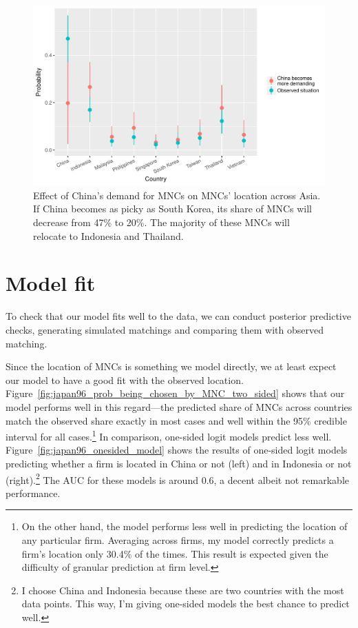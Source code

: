 \begin{figure}[!ht]
  \centering
  \includegraphics[width=\textwidth,keepaspectratio]{../figure/japan96_sim_china_more_demanding}
  \caption[Effect of China's demand for MNCs on MNCs' location across
  Asia.]{Effect of China's demand for MNCs on MNCs' location across Asia. If
    China becomes as picky as South Korea, its share of MNCs will decrease from
    47\% to 20\%. The majority of these MNCs will relocate to Indonesia and
    Thailand.}
  \label{fig:japan96_sim_china_more_demanding}
\end{figure}

\section{Model fit}
\label{sec:model_fit}

To check that our model fits well to the data, we can conduct posterior
predictive checks, generating simulated matchings and comparing them with observed
matching.

Since the location of MNCs is something we model directly, we at least
expect our model to have a good fit with the observed location.
Figure~\ref{fig:japan96_prob_being_chosen_by_MNC_two_sided} shows that our model
performs well in this regard---the predicted share of MNCs across countries
match the observed share exactly in most cases and well within the 95\% credible
interval for all cases.\footnote{On the other hand, the model performs less well in
predicting the location of any particular firm. Averaging across firms, my model
correctly predicts a firm's location only 30.4\% of the times. This result is
expected given the difficulty of granular prediction at firm level.
} In comparison, one-sided logit models predict less well.
Figure~\ref{fig:japan96_onesided_model} shows the results of
one-sided logit models predicting whether a firm is located in China or not
(left) and in Indonesia or not (right).\footnote{I choose China and Indonesia
  because these are two countries with the most data points. This way, I'm
  giving one-sided models the best chance to predict well.} The AUC for these
models is around 0.6, a decent albeit not remarkable performance.

